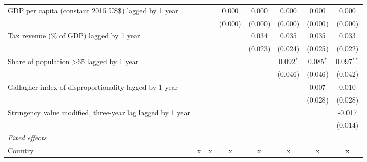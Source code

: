 \begin{tabular}{lccccccc}
   GDP per capita (constant 2015 US\$) lagged by 1 year                                      &              &              & 0.000        & 0.000       & 0.000         & 0.000         & 0.000\\   
                                                                                             &              &              & (0.000)      & (0.000)     & (0.000)       & (0.000)       & (0.000)\\   
   Tax revenue (\% of GDP) lagged by 1 year                                                  &              &              &              & 0.034       & 0.035         & 0.035         & 0.033\\   
                                                                                             &              &              &              & (0.023)     & (0.024)       & (0.025)       & (0.022)\\   
   Share of population >65 lagged by 1 year                                                  &              &              &              &             & 0.092$^{*}$   & 0.085$^{*}$   & 0.097$^{**}$\\   
                                                                                             &              &              &              &             & (0.046)       & (0.046)       & (0.042)\\   
   Gallagher index of disproportionality lagged by 1 year                                    &              &              &              &             &               & 0.007         & 0.010\\   
                                                                                             &              &              &              &             &               & (0.028)       & (0.028)\\   
   Stringency value modified, three-year lag lagged by 1 year                                &              &              &              &             &               &               & -0.017\\   
                                                                                             &              &              &              &             &               &               & (0.014)\\   
   \emph{Fixed effects}\\
   Country                                                                                   & x            & x            & x            & x           & x             & x             & x\\  

\end{tabular}

